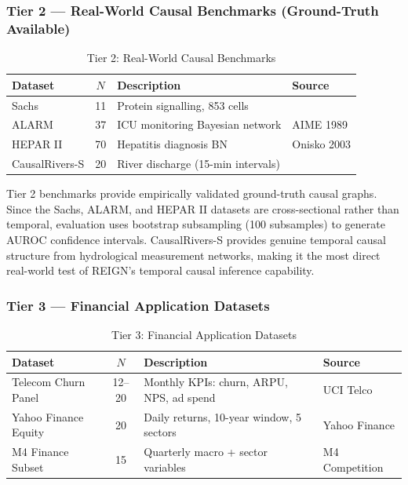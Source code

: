 \subsubsection{Tier 2 — Real-World Causal Benchmarks (Ground-Truth Available)}

\begin{table}[htbp]
\centering
\caption{Tier 2: Real-World Causal Benchmarks}
\label{tab:tier2}
\begin{tabular}{l c l l}
\toprule
\textbf{Dataset} & \textbf{$N$} & \textbf{Description} & \textbf{Source} \\
\midrule
Sachs          & 11 & Protein signalling, 853 cells       & \cite{Sachs2005} \\
ALARM          & 37 & ICU monitoring Bayesian network     & AIME 1989 \\
HEPAR II       & 70 & Hepatitis diagnosis BN              & Onisko 2003 \\
CausalRivers-S & 20 & River discharge (15-min intervals)  & \cite{Stein2025} \\
\bottomrule
\end{tabular}
\end{table}

Tier 2 benchmarks provide empirically validated ground-truth causal graphs. Since the Sachs, ALARM, and HEPAR II datasets are cross-sectional rather than temporal, evaluation uses bootstrap subsampling (100 subsamples) to generate AUROC confidence intervals. CausalRivers-S \cite{Stein2025} provides genuine temporal causal structure from hydrological measurement networks, making it the most direct real-world test of REIGN's temporal causal inference capability.

\subsubsection{Tier 3 — Financial Application Datasets}

\begin{table}[htbp]
\centering
\caption{Tier 3: Financial Application Datasets}
\label{tab:tier3}
\begin{tabular}{lcll}
\toprule
\textbf{Dataset} & \textbf{$N$} & \textbf{Description} & \textbf{Source} \\
\midrule
Telecom Churn Panel  & 12–20 & Monthly KPIs: churn, ARPU, NPS, ad spend  & UCI Telco \\
Yahoo Finance Equity & 20    & Daily returns, 10-year window, 5 sectors  & Yahoo Finance \\
M4 Finance Subset    & 15    & Quarterly macro + sector variables        & M4 Competition \\
\bottomrule
\end{tabular}
\end{table}


